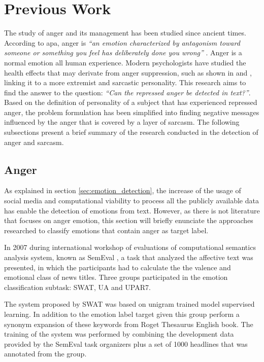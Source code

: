 
\section{Previous Work}
\label{sec:previous_work}

The study of anger and its management has been studied since ancient times. According to \acrfull{apa}, anger is \textit{``an emotion characterized by antagonism toward someone or something you feel has deliberately done you wrong''} \cite{angerAPA}. Anger is a normal emotion all human experience. Modern psychologists have studied the health effects that may derivate from anger suppression, such as shown in \cite{kemp1995anger} and \cite{hall1899study}, linking it to a more extremist and sarcastic personality. This research aims to find the answer to the question: \textit{``Can the repressed anger be detected in text?''}. Based on the definition of personality of a subject that has experienced repressed anger, the problem formulation has been simplified into finding negative messages influenced by the anger that is covered by a layer of sarcasm. The following subsections present a brief summary of the research conducted in the detection of anger and sarcasm.

\subsection{Anger}
\label{subsec:anger}

As explained in section \ref{sec:emotion_detection}, the increase of the usage of social media and computational viability to process all the publicly available data has enable the detection of emotions from text. However, as there is not literature that focuses on anger emotion, this section will briefly enunciate the approaches researched to classify emotions that contain anger as target label.

In 2007 during international workshop of evaluations of computational semantics analysis system, known as SemEval \cite{SemEvalPortal}, a task that analyzed the affective text was presented, in which the participants had to calculate the the valence and emotional class of news titles. Three groups participated in the emotion classification subtask: SWAT, UA and UPAR7. 

The system proposed by SWAT was based on unigram trained model supervised learning. In addition to the emotion label target given this group perform a synonym expansion of these keywords from Roget Thesaurus English book. The training of the system was performed by combining the development data provided by the SemEval task organizers plus a set of 1000 headlines that was annotated from the group.

